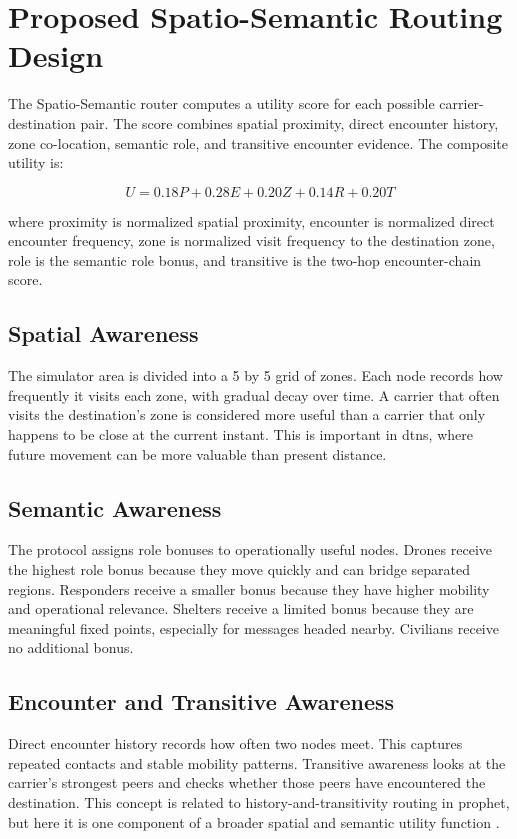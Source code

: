\section{Proposed Spatio-Semantic Routing Design}
The Spatio-Semantic router computes a utility score for each possible carrier-destination pair. The score combines spatial proximity, direct encounter history, zone co-location, semantic role, and transitive encounter evidence. The composite utility is:

\begin{equation}
	U = 0.18P + 0.28E + 0.20Z + 0.14R + 0.20T
\end{equation}

where \ac{proximity} is normalized spatial proximity, \ac{encounter} is normalized direct encounter frequency, \ac{zone} is normalized visit frequency to the destination zone, \ac{role} is the semantic role bonus, and \ac{transitive} is the two-hop encounter-chain score.

\subsection{Spatial Awareness}
The simulator area is divided into a 5 by 5 grid of zones. Each node records how frequently it visits each zone, with gradual decay over time. A carrier that often visits the destination's zone is considered more useful than a carrier that only happens to be close at the current instant. This is important in \acp{dtn}, where future movement can be more valuable than present distance.

\subsection{Semantic Awareness}
The protocol assigns role bonuses to operationally useful nodes. Drones receive the highest role bonus because they move quickly and can bridge separated regions. Responders receive a smaller bonus because they have higher mobility and operational relevance. Shelters receive a limited bonus because they are meaningful fixed points, especially for messages headed nearby. Civilians receive no additional bonus.

\subsection{Encounter and Transitive Awareness}
Direct encounter history records how often two nodes meet. This captures repeated contacts and stable mobility patterns. Transitive awareness looks at the carrier's strongest peers and checks whether those peers have encountered the destination. This concept is related to history-and-transitivity routing in \ac{prophet}, but here it is one component of a broader spatial and semantic utility function \citep{lindgren2012prophet}.

